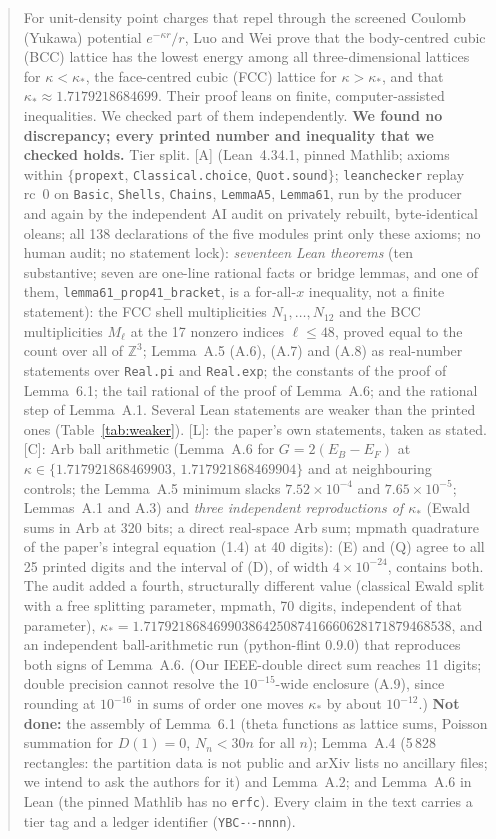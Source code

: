 \documentclass[11pt]{article}
\newcommand{\tier}[1]{\textsf{[#1]}}
\newcommand{\tA}{\tier{A}}
\newcommand{\tL}{\tier{L}}
\newcommand{\tC}{\tier{C}}
\newcommand{\lean}[1]{\texttt{#1}}
\newcommand{\ks}{\kappa_*}
\begin{document}
\begin{abstract}
For unit-density point charges that repel through the screened Coulomb (Yukawa) potential $e^{-\kappa r}/r$, Luo and Wei prove that the
body-centred cubic (BCC) lattice has the lowest energy among all three-dimensional lattices for $\kappa<\ks$, the face-centred cubic (FCC)
lattice for $\kappa>\ks$, and that $\ks\approx 1.7179218684699$. Their proof leans on finite, computer-assisted inequalities. We checked
part of them independently. \textbf{We found no discrepancy; every printed number and inequality that we checked holds.}
Tier split.
\tA{} (Lean~4.34.1, pinned Mathlib; axioms within $\{$\lean{propext}, \lean{Classical.choice}, \lean{Quot.sound}$\}$; \texttt{leanchecker}
replay rc~0 on \lean{Basic}, \lean{Shells}, \lean{Chains}, \lean{LemmaA5}, \lean{Lemma61}, run by the producer and again by the independent AI audit on privately rebuilt,
byte-identical oleans; all 138 declarations of the five modules print only these axioms; no human audit; no statement lock):
\emph{seventeen Lean theorems} (ten substantive; seven are one-line rational facts or bridge lemmas, and one of them,
\lean{lemma61\_prop41\_bracket}, is a for-all-$x$ inequality, not a finite statement): the FCC shell multiplicities $N_1,\dots,N_{12}$ and the BCC multiplicities $M_\ell$ at the
17 nonzero indices $\ell\le48$, proved equal to the count over all of $\mathbb Z^3$; Lemma~A.5 (A.6), (A.7) and (A.8) as real-number statements over \lean{Real.pi}
and \lean{Real.exp}; the constants of the proof of Lemma~6.1; the tail rational of the proof of Lemma~A.6; and the rational step of Lemma~A.1.
Several Lean statements are weaker than the printed ones (Table~\ref{tab:weaker}).
\tL{}: the paper's own statements, taken as stated.
\tC{}: Arb ball arithmetic (Lemma~A.6 for $G=2(E_B-E_F)$ at $\kappa\in\{1.717921868469903,\,1.717921868469904\}$ and at neighbouring controls;
the Lemma~A.5 minimum slacks $7.52\times10^{-4}$ and $7.65\times10^{-5}$; Lemmas~A.1 and A.3) and \emph{three independent reproductions of $\ks$}
(Ewald sums in Arb at 320 bits; a direct real-space Arb sum; mpmath quadrature of the paper's integral equation (1.4) at 40 digits): (E) and (Q) agree to all 25 printed digits and the
interval of (D), of width $4\times10^{-24}$, contains both. The audit added a fourth, structurally different value (classical Ewald split with a free splitting parameter, mpmath, 70 digits,
independent of that parameter), $\ks=1.71792186846990386425087416660628171879468538$, and an independent ball-arithmetic run (python-flint 0.9.0) that reproduces both signs of Lemma~A.6.
(Our IEEE-double direct sum reaches 11 digits; double precision cannot resolve the $10^{-15}$-wide enclosure (A.9), since rounding at $10^{-16}$ in sums of order one moves $\ks$ by about $10^{-12}$.)
\textbf{Not done:} the assembly of Lemma~6.1 (theta functions as lattice sums, Poisson summation for $D(1)=0$, $N_n<30n$ for all $n$);
Lemma~A.4 (5\,828 rectangles: the partition data is not public and arXiv lists no ancillary files; we intend to ask the authors for it) and Lemma~A.2; and Lemma~A.6 in Lean (the pinned Mathlib has no \lean{erfc}).
Every claim in the text carries a tier tag and a ledger identifier (\texttt{YBC-$\cdot$-nnnn}).


\end{abstract}
\end{document}
